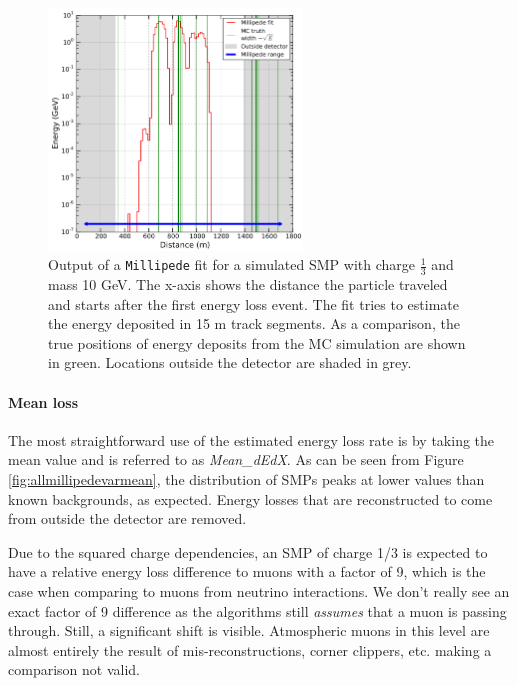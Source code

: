 \begin{figure}
\centering
\includegraphics[width=0.6\textwidth]{chapter8/img/millipedeStef.png}
\caption{Output of a \texttt{Millipede} fit for a simulated SMP with charge $\frac{1}{3}$ and mass 10 GeV. The x-axis shows the distance the particle traveled and starts after the first energy loss event. The fit tries to estimate the energy deposited in 15 m track segments. As a comparison, the true positions of energy deposits from the MC simulation are shown in green. Locations outside the detector are shaded in grey.}
\label{fig:millipedeoutput}
\end{figure}

\paragraph{Mean loss}
The most straightforward use of the estimated energy loss rate is by taking the mean value and is referred to as \textit{Mean\_dEdX}. As can be seen from Figure \ref{fig:allmillipedevarmean}, the distribution of SMPs peaks at lower values than known backgrounds, as expected. Energy losses that are reconstructed to come from outside the detector are removed. 

Due to the squared charge dependencies, an SMP of charge 1/3 is expected to have a relative energy loss difference to muons with a factor of 9, which is the case when comparing to muons from neutrino interactions. We don't really see an exact factor of 9 difference as the algorithms still \textit{assumes} that a muon is passing through. Still, a significant shift is visible. Atmospheric muons in this level are almost entirely the result of mis-reconstructions, corner clippers, etc. making a comparison not valid.

